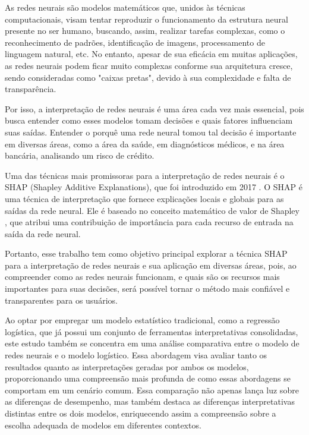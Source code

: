 As redes neurais são modelos matemáticos que, unidos às técnicas computacionais, visam tentar reproduzir
 o funcionamento da estrutura neural presente no ser humano, buscando, assim, realizar tarefas complexas,
  como o reconhecimento de padrões, identificação de imagens, processamento de linguagem natural, etc. 
  No entanto, apesar de sua eficácia em muitas aplicações, as redes neurais podem ficar muito complexas
   conforme sua arquitetura cresce, sendo consideradas como "caixas pretas", devido à sua complexidade 
   e falta de transparência. 

Por isso, a interpretação de redes neurais é uma área cada vez mais essencial, pois busca entender como
 esses modelos tomam decisões e quais fatores influenciam suas saídas. Entender o porquê uma rede 
 neural tomou tal decisão é importante em diversas áreas, como a área da saúde, em diagnósticos médicos, 
 e na área bancária, analisando um risco de crédito.

Uma das técnicas mais promissoras para a interpretação de redes neurais é o SHAP (Shapley Additive Explanations), 
que foi introduzido em 2017 \cite{lundberg2017unified}. O SHAP é uma técnica de interpretação que fornece explicações
 locais e globais para as saídas da rede neural. Ele é baseado no conceito matemático de valor de Shapley \cite{shapley1953value},
  que atribui uma contribuição de importância para cada recurso de entrada na saída da rede neural.

Portanto, esse trabalho tem como objetivo principal explorar a técnica SHAP para a interpretação de redes neurais 
e sua aplicação em diversas áreas, pois, ao compreender como as redes neurais funcionam, e quais são os 
recursos mais importantes para suas decisões, será possível tornar o método mais confiável e transparentes para os usuários. 


Ao optar por empregar um modelo estatístico tradicional, como a regressão logística, que já possui um conjunto de ferramentas
interpretativas consolidadas, este estudo também se concentra em uma análise comparativa entre o modelo de redes neurais e 
o modelo logístico. Essa abordagem visa avaliar tanto os resultados quanto as interpretações geradas por ambos os modelos,
proporcionando uma compreensão mais profunda de como essas abordagens se comportam em um cenário comum. Essa comparação não
apenas lança luz sobre as diferenças de desempenho, mas também destaca as diferenças interpretativas distintas entre os dois
modelos, enriquecendo assim a compreensão sobre a escolha adequada de modelos em diferentes contextos.